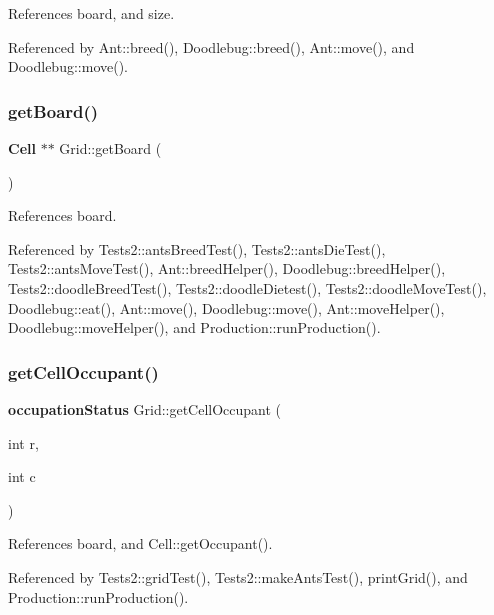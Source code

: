 References board, and size.



Referenced by Ant\+::breed(), Doodlebug\+::breed(), Ant\+::move(), and Doodlebug\+::move().

\mbox{\label{classGrid_a868367caac87e928c995444ab1f0cc89}} 
\subsubsection{get\+Board()}
{\footnotesize\ttfamily \textbf{ Cell} $\ast$$\ast$ Grid\+::get\+Board (\begin{DoxyParamCaption}{ }\end{DoxyParamCaption})}



References board.



Referenced by Tests2\+::ants\+Breed\+Test(), Tests2\+::ants\+Die\+Test(), Tests2\+::ants\+Move\+Test(), Ant\+::breed\+Helper(), Doodlebug\+::breed\+Helper(), Tests2\+::doodle\+Breed\+Test(), Tests2\+::doodle\+Dietest(), Tests2\+::doodle\+Move\+Test(), Doodlebug\+::eat(), Ant\+::move(), Doodlebug\+::move(), Ant\+::move\+Helper(), Doodlebug\+::move\+Helper(), and Production\+::run\+Production().

\mbox{\label{classGrid_ae9f685fddd449805e372d59cfa6c42d6}} 
\subsubsection{get\+Cell\+Occupant()}
{\footnotesize\ttfamily \textbf{ occupation\+Status} Grid\+::get\+Cell\+Occupant (\begin{DoxyParamCaption}\item[{int}]{r,  }\item[{int}]{c }\end{DoxyParamCaption})}



References board, and Cell\+::get\+Occupant().



Referenced by Tests2\+::grid\+Test(), Tests2\+::make\+Ants\+Test(), print\+Grid(), and Production\+::run\+Production().

\mbox{\label{classGrid_a04601ea9795a6928190e64fa89f10499}} 
